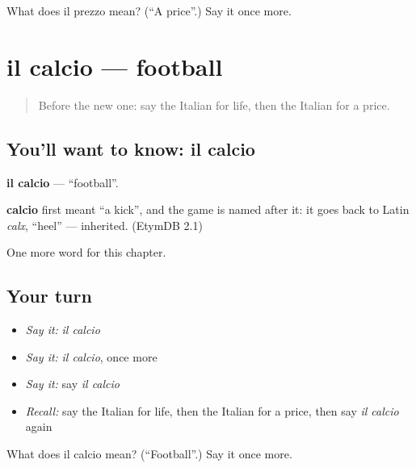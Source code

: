 \begin{tcolorbox}[breakable,colback=teal!4,colframe=teal!35!black,title={Before you move on}]
What does il prezzo mean? (\textquotedblleft{}A price\textquotedblright{}.) Say it once more.
\end{tcolorbox}
\section[il calcio]{il calcio — football}

\label{lesson:IT-C117-calcio}



\begin{quote}
Before the new one: say the Italian for life, then the Italian for a price.
\end{quote}

\subsection*{You'll want to know: il calcio}
\textbf{il calcio} — \textquotedblleft{}football\textquotedblright{}.

\begin{cousinweb}
\textbf{calcio} first meant \textquotedblleft{}a kick\textquotedblright{}, and the game is named after it: it goes back to Latin \emph{calx}, \textquotedblleft{}heel\textquotedblright{} — inherited. (EtymDB 2.1)
\end{cousinweb}

\begin{grammarlens}[title={What you've built}]
One more word for this chapter.
\end{grammarlens}

\subsection*{Your turn}
\begin{itemize}
\raggedright
  \item \emph{Say it:} \emph{il calcio}
  \item \emph{Say it:} \emph{il calcio}, once more
  \item \emph{Say it:} say \emph{il calcio}
  \item \emph{Recall:} say the Italian for life, then the Italian for a price, then say \emph{il calcio} again
\end{itemize}

\begin{tcolorbox}[breakable,colback=teal!4,colframe=teal!35!black,title={Before you move on}]
What does il calcio mean? (\textquotedblleft{}Football\textquotedblright{}.) Say it once more.
\end{tcolorbox}
